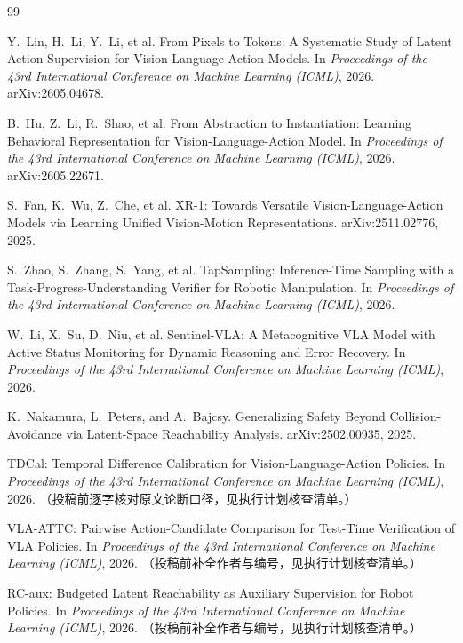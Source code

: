 \documentclass[11pt,a4paper]{ctexart}
\begin{document}
\begin{thebibliography}{99}\small

Y.~Lin, H.~Li, Y.~Li, et al.
From Pixels to Tokens: A Systematic Study of Latent Action Supervision for Vision-Language-Action Models.
In \emph{Proceedings of the 43rd International Conference on Machine Learning (ICML)}, 2026.
arXiv:2605.04678.

B.~Hu, Z.~Li, R.~Shao, et al.
From Abstraction to Instantiation: Learning Behavioral Representation for Vision-Language-Action Model.
In \emph{Proceedings of the 43rd International Conference on Machine Learning (ICML)}, 2026.
arXiv:2605.22671.

S.~Fan, K.~Wu, Z.~Che, et al.
XR-1: Towards Versatile Vision-Language-Action Models via Learning Unified Vision-Motion Representations.
arXiv:2511.02776, 2025.

S.~Zhao, S.~Zhang, S.~Yang, et al.
TapSampling: Inference-Time Sampling with a Task-Progress-Understanding Verifier for Robotic Manipulation.
In \emph{Proceedings of the 43rd International Conference on Machine Learning (ICML)}, 2026.

W.~Li, X.~Su, D.~Niu, et al.
Sentinel-VLA: A Metacognitive VLA Model with Active Status Monitoring for Dynamic Reasoning and Error Recovery.
In \emph{Proceedings of the 43rd International Conference on Machine Learning (ICML)}, 2026.

K.~Nakamura, L.~Peters, and A.~Bajcsy.
Generalizing Safety Beyond Collision-Avoidance via Latent-Space Reachability Analysis.
arXiv:2502.00935, 2025.

TDCal: Temporal Difference Calibration for Vision-Language-Action Policies.
In \emph{Proceedings of the 43rd International Conference on Machine Learning (ICML)}, 2026.
（投稿前逐字核对原文论断口径，见执行计划核查清单。）

VLA-ATTC: Pairwise Action-Candidate Comparison for Test-Time Verification of VLA Policies.
In \emph{Proceedings of the 43rd International Conference on Machine Learning (ICML)}, 2026.
（投稿前补全作者与编号，见执行计划核查清单。）

RC-aux: Budgeted Latent Reachability as Auxiliary Supervision for Robot Policies.
In \emph{Proceedings of the 43rd International Conference on Machine Learning (ICML)}, 2026.
（投稿前补全作者与编号，见执行计划核查清单。）


\end{thebibliography}
\end{document}

